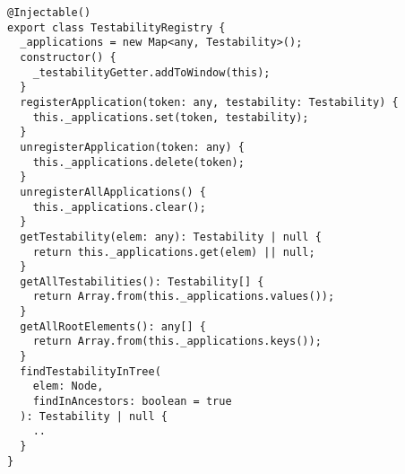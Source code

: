 \begin{verbatim}
@Injectable()
export class TestabilityRegistry {
  _applications = new Map<any, Testability>();
  constructor() {
    _testabilityGetter.addToWindow(this);
  }
  registerApplication(token: any, testability: Testability) {
    this._applications.set(token, testability);
  }
  unregisterApplication(token: any) {
    this._applications.delete(token);
  }
  unregisterAllApplications() {
    this._applications.clear();
  }
  getTestability(elem: any): Testability | null {
    return this._applications.get(elem) || null;
  }
  getAllTestabilities(): Testability[] {
    return Array.from(this._applications.values());
  }
  getAllRootElements(): any[] {
    return Array.from(this._applications.keys());
  }
  findTestabilityInTree(
    elem: Node,
    findInAncestors: boolean = true
  ): Testability | null {
    ..
  }
}
\end{verbatim}
